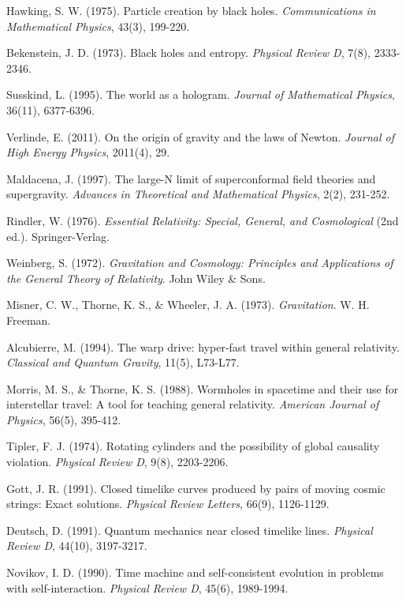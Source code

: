 \documentclass[12pt,a4paper]{article}
\begin{document}
\begin{thebibliography}{99}
Hawking, S. W. (1975). Particle creation by black holes. \textit{Communications in Mathematical Physics}, 43(3), 199-220.

Bekenstein, J. D. (1973). Black holes and entropy. \textit{Physical Review D}, 7(8), 2333-2346.

Susskind, L. (1995). The world as a hologram. \textit{Journal of Mathematical Physics}, 36(11), 6377-6396.

Verlinde, E. (2011). On the origin of gravity and the laws of Newton. \textit{Journal of High Energy Physics}, 2011(4), 29.

Maldacena, J. (1997). The large-N limit of superconformal field theories and supergravity. \textit{Advances in Theoretical and Mathematical Physics}, 2(2), 231-252.

Rindler, W. (1976). \textit{Essential Relativity: Special, General, and Cosmological} (2nd ed.). Springer-Verlag.

Weinberg, S. (1972). \textit{Gravitation and Cosmology: Principles and Applications of the General Theory of Relativity}. John Wiley \& Sons.

Misner, C. W., Thorne, K. S., \& Wheeler, J. A. (1973). \textit{Gravitation}. W. H. Freeman.

Alcubierre, M. (1994). The warp drive: hyper-fast travel within general relativity. \textit{Classical and Quantum Gravity}, 11(5), L73-L77.

Morris, M. S., \& Thorne, K. S. (1988). Wormholes in spacetime and their use for interstellar travel: A tool for teaching general relativity. \textit{American Journal of Physics}, 56(5), 395-412.

Tipler, F. J. (1974). Rotating cylinders and the possibility of global causality violation. \textit{Physical Review D}, 9(8), 2203-2206.

Gott, J. R. (1991). Closed timelike curves produced by pairs of moving cosmic strings: Exact solutions. \textit{Physical Review Letters}, 66(9), 1126-1129.

Deutsch, D. (1991). Quantum mechanics near closed timelike lines. \textit{Physical Review D}, 44(10), 3197-3217.

Novikov, I. D. (1990). Time machine and self-consistent evolution in problems with self-interaction. \textit{Physical Review D}, 45(6), 1989-1994.


\end{thebibliography}
\end{document}
